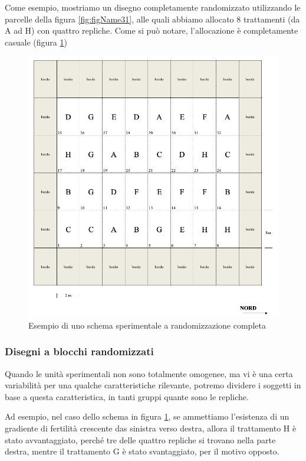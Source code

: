 \documentclass[a4paper,12pt,oneside]{book}
\begin{document}
Come esempio, mostriamo un disegno completamente randomizzato utilizzando le parcelle della figura \ref{fig:figName31}, alle quali abbiamo allocato 8 trattamenti (da A ad H) con quattro repliche. Come si può notare, l'allocazione è completamente casuale (figura \ref{fig:figName33})

\begin{figure}

{\centering \includegraphics[width=0.9\linewidth]{_images/Mappa1CRD} 

}

\caption{Esempio di uno schema sperimentale a randomizzazione completa}\label{fig:figName33}
\end{figure}

\hypertarget{disegni-a-blocchi-randomizzati}{%
\subsubsection{Disegni a blocchi randomizzati}\label{disegni-a-blocchi-randomizzati}}

Quando le unità sperimentali non sono totalmente omogenee, ma vi è una certa variabilità per una qualche caratteristiche rilevante, potremo dividere i soggetti in base a questa caratteristica, in tanti gruppi quante sono le repliche.

Ad esempio, nel caso dello schema in figura \ref{fig:figName33}, se ammettiamo l'esistenza di un gradiente di fertilità crescente das sinistra verso destra, allora il trattamento H è stato avvantaggiato, perché tre delle quattro repliche si trovano nella parte destra, mentre il trattamento G è stato svantaggiato, per il motivo opposto.
\end{document}

